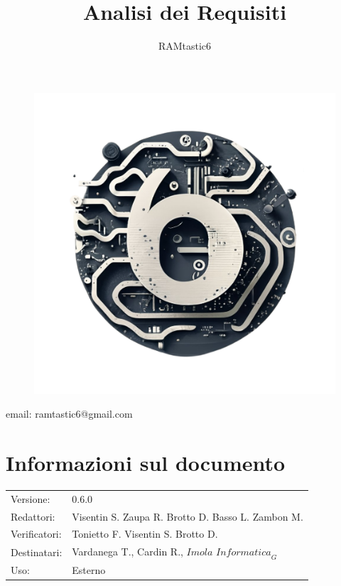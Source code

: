\documentclass[12pt, oneside]{article}
\author{RAMtastic6}
\begin{document}
\thispagestyle{empty}
\title{Analisi dei Requisiti}
\maketitle
\begin{figure}[h]
  \centering
  \includegraphics[scale=0.3]{logo.png}
\end{figure}
\begin{center}
    email: ramtastic6@gmail.com
\end{center}

\section*{Informazioni sul documento} 
\begin{tabular}{ll}
Versione: & 0.6.0 \\
Redattori: &  Visentin S.  Zaupa R. Brotto D. Basso L. Zambon M. \\ 
Verificatori: & Tonietto F. Visentin S. Brotto D. \\
Destinatari: & Vardanega T., Cardin R., $\textit{Imola Informatica}_G$ \\
Uso: & Esterno
\end{tabular}
\newpage
\end{document}
